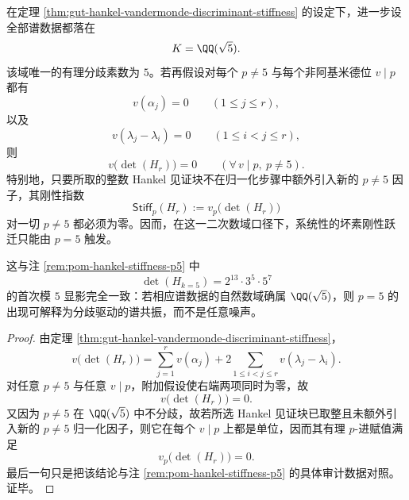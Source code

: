 \begin{corollary}\label{cor:gut-qsqrtfive-ramified-prime-stiffness}
在定理 \ref{thm:gut-hankel-vandermonde-discriminant-stiffness} 的设定下，进一步设全部谱数据都落在
\[
K=\QQ(\sqrt5).
\]
该域唯一的有理分歧素数为 \(5\)。若再假设对每个 \(p\neq 5\) 与每个非阿基米德位 \(v\mid p\) 都有
\[
v(\alpha_j)=0
\qquad(1\le j\le r),
\]
以及
\[
v(\lambda_j-\lambda_i)=0
\qquad(1\le i<j\le r),
\]
则
\[
v\!\bigl(\det(H_r)\bigr)=0
\qquad(\forall\, v\mid p,\ p\neq 5).
\]
特别地，只要所取的整数 Hankel 见证块不在归一化步骤中额外引入新的 \(p\neq 5\) 因子，其刚性指数
\[
\mathsf{Stiff}_p(H_r):=v_p\!\bigl(\det(H_r)\bigr)
\]
对一切 \(p\neq 5\) 都必须为零。因而，在这一二次数域口径下，系统性的坏素刚性跃迁只能由 \(p=5\) 触发。

这与注 \ref{rem:pom-hankel-stiffness-p5} 中
\[
\det(H_{k=5})=2^{13}\cdot 3^5\cdot 5^7
\]
的首次模 \(5\) 显影完全一致：若相应谱数据的自然数域确属 \(\QQ(\sqrt5)\)，则 \(p=5\) 的出现可解释为分歧驱动的谱共振，而不是任意噪声。
\end{corollary}
\begin{proof}
由定理 \ref{thm:gut-hankel-vandermonde-discriminant-stiffness}，
\[
v\!\bigl(\det(H_r)\bigr)
=
\sum_{j=1}^{r}v(\alpha_j)
+
2\sum_{1\le i<j\le r}v(\lambda_j-\lambda_i).
\]
对任意 \(p\neq 5\) 与任意 \(v\mid p\)，附加假设使右端两项同时为零，故
\[
v\!\bigl(\det(H_r)\bigr)=0.
\]
又因为 \(p\neq 5\) 在 \(\QQ(\sqrt5)\) 中不分歧，故若所选 Hankel 见证块已取整且未额外引入新的 \(p\neq 5\) 归一化因子，则它在每个 \(v\mid p\) 上都是单位，因而其有理 \(p\)-进赋值满足
\[
v_p\!\bigl(\det(H_r)\bigr)=0.
\]
最后一句只是把该结论与注 \ref{rem:pom-hankel-stiffness-p5} 的具体审计数据对照。证毕。
\end{proof}
